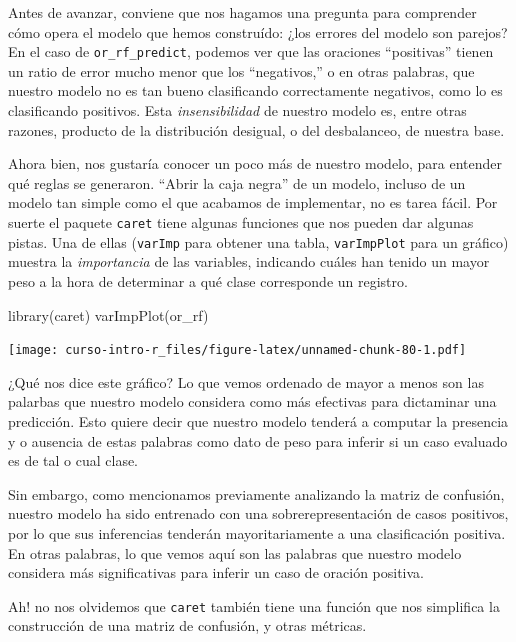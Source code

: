 \documentclass[
]{book}
\newenvironment{Shaded}{\begin{snugshade}}{\end{snugshade}}
\newcommand{\FunctionTok}[1]{\textcolor[rgb]{0.00,0.00,0.00}{#1}}
\newcommand{\NormalTok}[1]{#1}
\begin{document}
Antes de avanzar, conviene que nos hagamos una pregunta para comprender cómo opera el modelo que hemos construído: ¿los errores del modelo son parejos? En el caso de \texttt{or\_rf\_predict}, podemos ver que las oraciones ``positivas'' tienen un ratio de error mucho menor que los ``negativos,'' o en otras palabras, que nuestro modelo no es tan bueno clasificando correctamente negativos, como lo es clasificando positivos. Esta \emph{insensibilidad} de nuestro modelo es, entre otras razones, producto de la distribución desigual, o del desbalanceo, de nuestra base.

Ahora bien, nos gustaría conocer un poco más de nuestro modelo, para entender qué reglas se generaron. ``Abrir la caja negra'' de un modelo, incluso de un modelo tan simple como el que acabamos de implementar, no es tarea fácil. Por suerte el paquete \texttt{caret} tiene algunas funciones que nos pueden dar algunas pistas. Una de ellas (\texttt{varImp} para obtener una tabla, \texttt{varImpPlot} para un gráfico) muestra la \emph{importancia} de las variables, indicando cuáles han tenido un mayor peso a la hora de determinar a qué clase corresponde un registro.

\begin{Shaded}
\begin{Highlighting}[]
\FunctionTok{library}\NormalTok{(caret)}
\FunctionTok{varImpPlot}\NormalTok{(or\_rf)}
\end{Highlighting}
\end{Shaded}

\texttt{[image: curso-intro-r\_files/figure-latex/unnamed-chunk-80-1.pdf]}

¿Qué nos dice este gráfico? Lo que vemos ordenado de mayor a menos son las palarbas que nuestro modelo considera como más efectivas para dictaminar una predicción. Esto quiere decir que nuestro modelo tenderá a computar la presencia y o ausencia de estas palabras como dato de peso para inferir si un caso evaluado es de tal o cual clase.

Sin embargo, como mencionamos previamente analizando la matriz de confusión, nuestro modelo ha sido entrenado con una sobrerepresentación de casos positivos, por lo que sus inferencias tenderán mayoritariamente a una clasificación positiva. En otras palabras, lo que vemos aquí son las palabras que nuestro modelo considera más significativas para inferir un caso de oración positiva.

Ah! no nos olvidemos que \texttt{caret} también tiene una función que nos simplifica la construcción de una matriz de confusión, y otras métricas.
\end{document}
